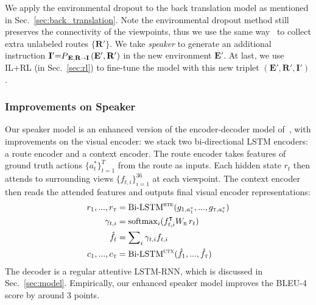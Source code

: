 \documentclass[11pt,a4paper]{article}
\begin{document}
We apply the environmental dropout to the back translation model as mentioned in Sec.~\ref{sec:back_translation}.
Note the environmental dropout method still preserves the connectivity of the viewpoints, thus we use the same way~\cite{fried2018speaker} to collect extra unlabeled routes $\{\mathbf{R'}\}$. 
We take \emph{speaker} to generate an additional instruction  $\mathbf{I'}\mbox{=} P_{\,\mathbf E, \mathbf R \shortrightarrow \mathbf{I}} \left(\mathbf {E'}, \mathbf{R'}\right)$ in the new environment $\mathbf{E'}$.
At last, we use IL+RL (in Sec.~\ref{sec:rl}) to fine-tune the model with this new triplet $(\mathbf{E'}, \mathbf{R'}, \mathbf{I'})$.


\subsubsection{Improvements on Speaker}
\label{sec:speaker}
Our speaker model is an enhanced version of the encoder-decoder model of~, with improvements on the visual encoder: we stack two bi-directional LSTM encoders: a route encoder and a context encoder.
The route encoder takes features of ground truth actions $\{a^*_t\}_{t=1}^{T}$ from the route as inputs. 
Each hidden state $r_t$ then attends to surrounding views $\{f_{t,i}\}_{i=1}^{36}$ at each viewpoint.
The context encoder then reads the attended features and outputs final visual encoder representations:
\begin{align}
    r_1, ..., r_\textsc{t} & = \mathrm{Bi\mbox{-}LSTM}^\textsc{rte} (g_{1, a^*_1}, ..., g_{\textsc{t}, a^*_\textsc{t}}) \\
    \gamma_{t,i} &= \mathrm{softmax}_i(f_{t,i}^\intercal W_\textsc{r} \, r_{t}) \\
    \hat f_t &= \sum\nolimits_i \gamma_{t,i} f_{t,i} \\
    c_1, ..., c_\textsc{t} & = \mathrm{Bi\mbox{-}LSTM}^\textsc{ctx} (\hat f_1, ..., \hat f_\textsc{t})
\end{align}
The decoder is a regular attentive LSTM-RNN, which is discussed in Sec.~\ref{sec:model}. 
Empirically, our enhanced speaker model improves the BLEU-4 score by around 3 points.
 
\end{document}
